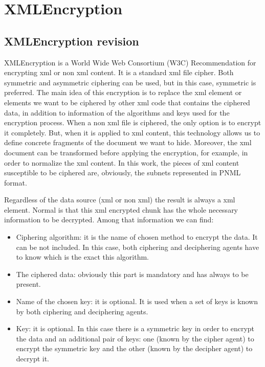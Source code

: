 \section{XMLEncryption}


\subsection{XMLEncryption revision}
XMLEncryption is a World Wide Web Consortium (W3C)
Recommendation for  encrypting xml or non xml content. It is a standard
xml file cipher. Both symmetric and asymmetric ciphering can be used, but in this case, symmetric is preferred.
The main idea of this encryption is to replace the xml element or elements
we want to be ciphered by other xml code that contains the ciphered data, in addition to information of the algorithms and keys used for the encryption process. When a non xml file is ciphered, the only option is to encrypt it completely. But,  when it is applied to xml content, this technology allows us to define concrete fragments of the document we want to hide. Moreover, the xml document can be transformed before applying the encryption, for example, in order to normalize the xml content.
In this work, the pieces of xml content susceptible to be ciphered are, obviously,
the subnets represented in PNML format. 

Regardless of the data source (xml or non xml) the result is always a xml element. Normal is that this xml encrypted chunk has the whole necessary information to be decrypted. Among that information we can find:

\begin{itemize}
\item Ciphering algorithm: it is the name of chosen method to encrypt
the data. It can be not included. In this case, both ciphering and deciphering agents have to know which is the exact this algorithm.
\item The ciphered data: obviously this part is mandatory and has always
to be present.
\item Name of the chosen key: it is optional. It is used when a set of keys is known by both ciphering and deciphering agents.
\item Key: it is optional. In this case there is a symmetric key in order
to encrypt the data and an additional pair of keys: one (known by the cipher
agent) to encrypt the symmetric key and the other (known by the decipher agent) to decrypt it. 
\end{itemize} 

